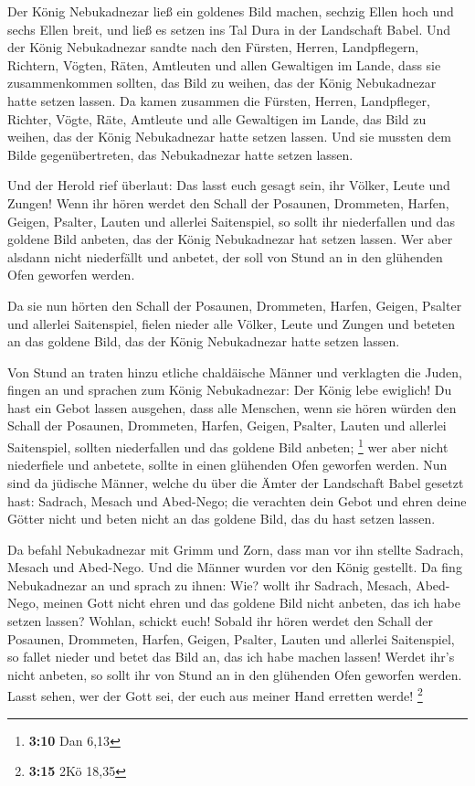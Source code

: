  Der König Nebukadnezar ließ ein goldenes Bild machen,
sechzig Ellen hoch und sechs Ellen breit, und ließ es setzen ins Tal
Dura in der Landschaft Babel.  Und der König Nebukadnezar
sandte nach den Fürsten, Herren, Landpflegern, Richtern, Vögten, Räten,
Amtleuten und allen Gewaltigen im Lande, dass sie zusammenkommen
sollten, das Bild zu weihen, das der König Nebukadnezar hatte setzen
lassen.  Da kamen zusammen die Fürsten, Herren, Landpfleger,
Richter, Vögte, Räte, Amtleute und alle Gewaltigen im Lande, das Bild zu
weihen, das der König Nebukadnezar hatte setzen lassen. Und sie mussten
dem Bilde gegenübertreten, das Nebukadnezar hatte setzen lassen.

 Und der Herold rief überlaut: Das lasst euch gesagt sein,
ihr Völker, Leute und Zungen!  Wenn ihr hören werdet den
Schall der Posaunen, Drommeten, Harfen, Geigen, Psalter, Lauten und
allerlei Saitenspiel, so sollt ihr niederfallen und das goldene Bild
anbeten, das der König Nebukadnezar hat setzen lassen.  Wer
aber alsdann nicht niederfällt und anbetet, der soll von Stund an in den
glühenden Ofen geworfen werden.

 Da sie nun hörten den Schall der Posaunen, Drommeten,
Harfen, Geigen, Psalter und allerlei Saitenspiel, fielen nieder alle
Völker, Leute und Zungen und beteten an das goldene Bild, das der König
Nebukadnezar hatte setzen lassen.

 Von Stund an traten hinzu etliche chaldäische Männer und
verklagten die Juden,  fingen an und sprachen zum König
Nebukadnezar: Der König lebe ewiglich!  Du hast ein Gebot
lassen ausgehen, dass alle Menschen, wenn sie hören würden den Schall
der Posaunen, Drommeten, Harfen, Geigen, Psalter, Lauten und allerlei
Saitenspiel, sollten niederfallen und das goldene Bild anbeten;
\footnote{\textbf{3:10} Dan 6,13}  wer aber nicht
niederfiele und anbetete, sollte in einen glühenden Ofen geworfen
werden.  Nun sind da jüdische Männer, welche du über die
Ämter der Landschaft Babel gesetzt hast: Sadrach, Mesach und Abed-Nego;
die verachten dein Gebot und ehren deine Götter nicht und beten nicht an
das goldene Bild, das du hast setzen lassen.

 Da befahl Nebukadnezar mit Grimm und Zorn, dass man vor
ihn stellte Sadrach, Mesach und Abed-Nego. Und die Männer wurden vor den
König gestellt.  Da fing Nebukadnezar an und sprach zu
ihnen: Wie? wollt ihr Sadrach, Mesach, Abed-Nego, meinen Gott nicht
ehren und das goldene Bild nicht anbeten, das ich habe setzen lassen?
 Wohlan, schickt euch! Sobald ihr hören werdet den Schall
der Posaunen, Drommeten, Harfen, Geigen, Psalter, Lauten und allerlei
Saitenspiel, so fallet nieder und betet das Bild an, das ich habe machen
lassen! Werdet ihr's nicht anbeten, so sollt ihr von Stund an in den
glühenden Ofen geworfen werden. Lasst sehen, wer der Gott sei, der euch
aus meiner Hand erretten werde! \footnote{\textbf{3:15} 2Kö 18,35}

